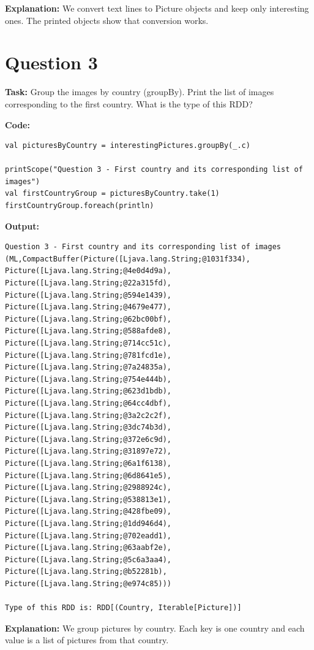 \documentclass[11pt]{article}
\begin{document}
\textbf{Explanation:} We convert text lines to Picture objects and keep only interesting ones. The printed objects show that conversion works.

\section*{Question 3}
\textbf{Task:} Group the images by country (groupBy). Print the list of images corresponding to the first country. What is the type of this RDD?

\textbf{Code:}
\begin{lstlisting}
val picturesByCountry = interestingPictures.groupBy(_.c)

printScope("Question 3 - First country and its corresponding list of images")
val firstCountryGroup = picturesByCountry.take(1)
firstCountryGroup.foreach(println)
\end{lstlisting}

\textbf{Output:}
\begin{lstlisting}
Question 3 - First country and its corresponding list of images
(ML,CompactBuffer(Picture([Ljava.lang.String;@1031f334), Picture([Ljava.lang.String;@4e0d4d9a), Picture([Ljava.lang.String;@22a315fd), Picture([Ljava.lang.String;@594e1439), Picture([Ljava.lang.String;@4679e477), Picture([Ljava.lang.String;@62bc00bf), Picture([Ljava.lang.String;@588afde8), Picture([Ljava.lang.String;@714cc51c), Picture([Ljava.lang.String;@781fcd1e), Picture([Ljava.lang.String;@7a24835a), Picture([Ljava.lang.String;@754e444b), Picture([Ljava.lang.String;@623d1bdb), Picture([Ljava.lang.String;@64cc4dbf), Picture([Ljava.lang.String;@3a2c2c2f), Picture([Ljava.lang.String;@3dc74b3d), Picture([Ljava.lang.String;@372e6c9d), Picture([Ljava.lang.String;@31897e72), Picture([Ljava.lang.String;@6a1f6138), Picture([Ljava.lang.String;@6d8641e5), Picture([Ljava.lang.String;@2988924c), Picture([Ljava.lang.String;@538813e1), Picture([Ljava.lang.String;@428fbe09), Picture([Ljava.lang.String;@1dd946d4), Picture([Ljava.lang.String;@702eadd1), Picture([Ljava.lang.String;@63aabf2e), Picture([Ljava.lang.String;@5c6a3aa4), Picture([Ljava.lang.String;@b52281b), Picture([Ljava.lang.String;@e974c85)))

Type of this RDD is: RDD[(Country, Iterable[Picture])]
\end{lstlisting}

\textbf{Explanation:} We group pictures by country. Each key is one country and each value is a list of pictures from that country.
\end{document}
